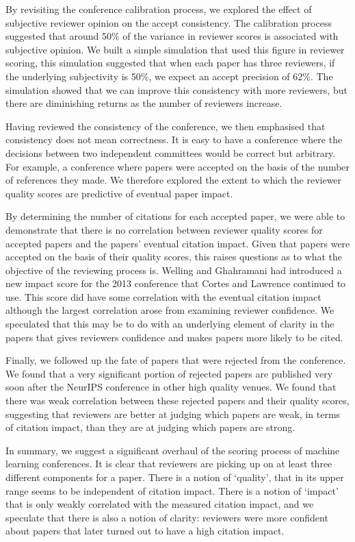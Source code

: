 \documentclass[twoside]{article}
\begin{document}
By revisiting the conference calibration process, we explored the effect of subjective reviewer opinion on the accept consistency. The calibration process suggested that around 50\% of the variance in reviewer scores is associated with subjective opinion. We built a simple simulation that used this figure in reviewer scoring, this simulation suggested that when each paper has three reviewers, if the underlying subjectivity is 50\%, we expect an accept precision of 62\%. The simulation showed that we can improve this consistency with more reviewers, but there are diminishing returns as the number of reviewers increase.

Having reviewed the consistency of the conference, we then emphasised that consistency does not mean correctness. It is easy to have a conference where the decisions between two independent committees would be correct but arbitrary. For example, a conference where papers were accepted on the basis of the number of references they made. We therefore explored the extent to which the reviewer quality scores are predictive of eventual paper impact. 

By determining the number of citations for each accepted paper, we were able to demonstrate that there is no correlation between reviewer quality scores for accepted papers and the papers' eventual citation impact. Given that papers were accepted on the basis of their quality scores, this raises questions as to what the objective of the reviewing process is. Welling and Ghahramani had introduced a new impact score for the 2013 conference that Cortes and Lawrence continued to use. This score did have some correlation with the eventual citation impact although the largest correlation arose from examining reviewer confidence. We speculated that this may be to do with an underlying element of clarity in the papers that gives reviewers confidence and makes papers more likely to be cited.

Finally, we followed up the fate of papers that were rejected from the conference. We found that a very significant portion of rejected papers are published very soon after the NeurIPS conference in other high quality venues. We found that there was weak correlation between these rejected papers and their quality scores, suggesting that reviewers are better at judging which papers are weak, in terms of citation impact, than they are at judging which papers are strong. 

In summary, we suggest a significant overhaul of the scoring process of machine learning conferences. It is clear that reviewers are picking up on at least three different components for a paper. There is a notion of `quality', that in its upper range seems to be independent of citation impact. There is a notion of `impact' that is only weakly correlated with the measured citation impact, and we speculate that there is also a notion of clarity: reviewers were more confident about papers that later turned out to have a high citation impact.
\end{document}
